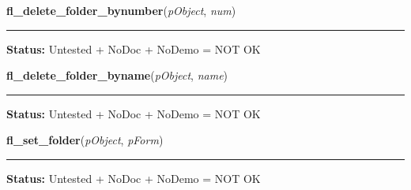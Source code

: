    \vspace{0.5ex}

\hspace{.8\funcindent}\begin{boxedminipage}{\funcwidth}

    \raggedright \textbf{fl\_delete\_folder\_bynumber}(\textit{pObject}, \textit{num})

    \vspace{-1.5ex}

    \rule{\textwidth}{0.5\fboxrule}
\setlength{\parskip}{2ex}
\setlength{\parskip}{1ex}
\textbf{Status:} Untested + NoDoc + NoDemo = NOT OK



    \end{boxedminipage}

    \label{xformslib:library:fl_delete_folder_byname}

    \vspace{0.5ex}

\hspace{.8\funcindent}\begin{boxedminipage}{\funcwidth}

    \raggedright \textbf{fl\_delete\_folder\_byname}(\textit{pObject}, \textit{name})

    \vspace{-1.5ex}

    \rule{\textwidth}{0.5\fboxrule}
\setlength{\parskip}{2ex}
\setlength{\parskip}{1ex}
\textbf{Status:} Untested + NoDoc + NoDemo = NOT OK



    \end{boxedminipage}

    \label{xformslib:library:fl_set_folder}

    \vspace{0.5ex}

\hspace{.8\funcindent}\begin{boxedminipage}{\funcwidth}

    \raggedright \textbf{fl\_set\_folder}(\textit{pObject}, \textit{pForm})

    \vspace{-1.5ex}

    \rule{\textwidth}{0.5\fboxrule}
\setlength{\parskip}{2ex}
\setlength{\parskip}{1ex}
\textbf{Status:} Untested + NoDoc + NoDemo = NOT OK



    \end{boxedminipage}

